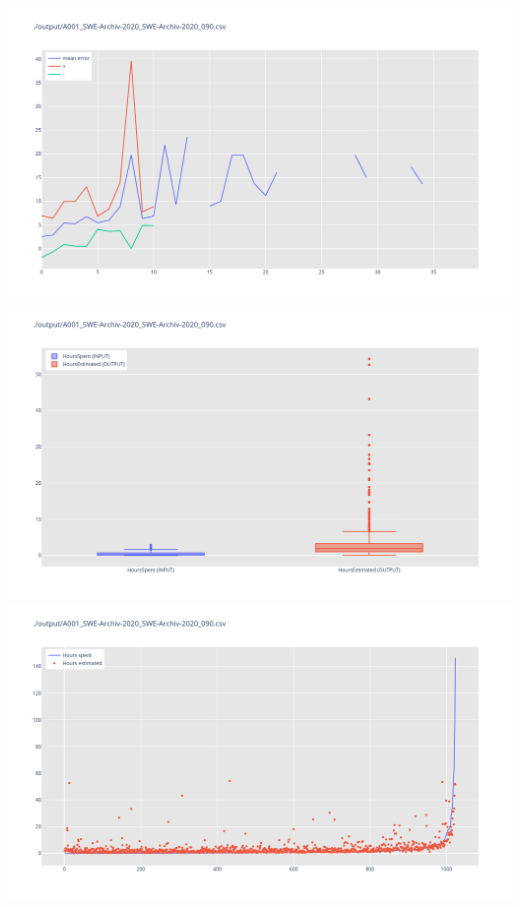 \includegraphics[width=\textwidth]{Scripts/output/A001_SWE-Archiv-2020_SWE-Archiv-2020_090.csv.error_distribution.png}
\includegraphics[width=\textwidth]{Scripts/output/A001_SWE-Archiv-2020_SWE-Archiv-2020_090.csv.png}
\includegraphics[width=\textwidth]{Scripts/output/A001_SWE-Archiv-2020_SWE-Archiv-2020_090.csv.scatter.png}
